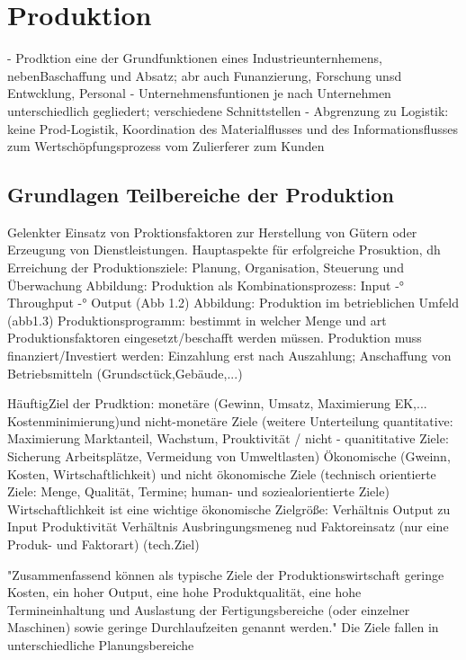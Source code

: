 \documentclass[a4paper,12pt, german]{report}
\begin{document}



\section{Produktion}

- Prodktion eine der Grundfunktionen eines Industrieunternhemens, nebenBaschaffung und Absatz; abr auch Funanzierung, Forschung unsd Entwcklung, Personal 
- Unternehmensfuntionen je nach Unternehmen unterschiedlich gegliedert; verschiedene Schnittstellen
- Abgrenzung zu Logistik: keine Prod-Logistik, Koordination des Materialflusses und des Informationsflusses zum Wertschöpfungsprozess vom Zulierferer zum Kunden
\cite{07}




\subsection{Grundlagen Teilbereiche der Produktion}

Gelenkter Einsatz von Proktionsfaktoren zur Herstellung von Gütern oder Erzeugung von Dienstleistungen. Hauptaspekte für erfolgreiche Prosuktion, dh Erreichung der Produktionsziele: Planung, Organisation, Steuerung und Überwachung 
Abbildung: Produktion als Kombinationsprozess: Input -° Throughput -° Output (Abb 1.2)
Abbildung: Produktion im betrieblichen Umfeld (abb1.3)
Produktionsprogramm: bestimmt in welcher Menge und art Produktionsfaktoren eingesetzt/beschafft werden müssen.
Produktion muss finanziert/Investiert werden: Einzahlung erst nach Auszahlung; Anschaffung von Betriebsmitteln (Grundsctück,Gebäude,...)
\cite{07}

HäuftigZiel der Prudktion: monetäre (Gewinn, Umsatz, Maximierung EK,... Kostenminimierung)und nicht-monetäre Ziele (weitere Unterteilung quantitative: Maximierung Marktanteil, Wachstum, Prouktivität / nicht - quanititative Ziele: Sicherung Arbeitsplätze, Vermeidung von Umweltlasten) 
Ökonomische (Gweinn, Kosten, Wirtschaftlichkeit) und nicht ökonomische Ziele (technisch orientierte Ziele: Menge, Qualität, Termine; human- und soziealorientierte Ziele)
Wirtschaftlichkeit ist eine wichtige ökonomische Zielgröße: Verhältnis Output zu Input
Produktivität Verhältnis Ausbringungsmeneg nud Faktoreinsatz (nur eine Produk- und Faktorart) (tech.Ziel)

"Zusammenfassend können als typische Ziele der Produktionswirtschaft geringe Kosten,
ein hoher Output, eine hohe Produktqualität, eine hohe Termineinhaltung und Auslastung
der Fertigungsbereiche (oder einzelner Maschinen) sowie geringe Durchlaufzeiten
genannt werden." Die Ziele fallen in unterschiedliche Planungsbereiche
\end{document}
